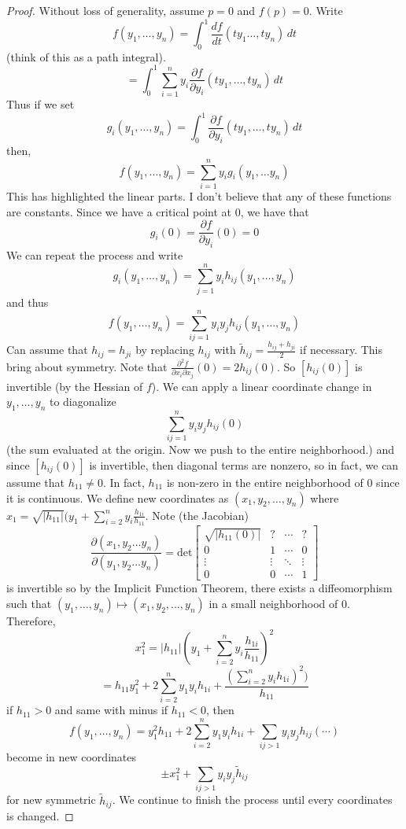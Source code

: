 \documentclass[12pt]{article}
\begin{document}
\begin{proof}
Without loss of generality, assume $p=0$ and $f(p)=0$. Write 
$$f(y_1, \dots, y_n) = \int^1_0 \frac{df}{dt}(ty_1 \dots, ty_n) \,dt$$
(think of this as a path integral).
$$=\int_0^1 \sum_{i=1}^n y_i\frac{\partial f}{\partial y_i }(ty_1, \dots, ty_n) \,dt $$
Thus if we set
$$g_i (y_1, \dots, y_n) = \int^1_0 \frac{\partial f}{\partial y_i }(ty_1, \dots, ty_n) \,dt$$
then,
$$f(y_1, \dots, y_n) = \sum^n_{i=1} y_ig_i(y_1, \dots y_n)$$
This has highlighted the linear parts. I don't believe that any of these functions are constants. Since we have a critical point at $0$, we have that 
$$g_i(0) = \frac{\partial f}{\partial y_i}(0) = 0$$
We can repeat the process and write 
$$g_i(y_1, \dots, y_n) = \sum^n_{j=1} y_i h_{ij}(y_1, \dots, y_n)$$
and thus 
$$f(y_1, \dots, y_n) = \sum^{n}_{ij=1} y_i y_j h_{ij}(y_1, \dots, y_n)$$
Can assume that $h_{ij} = h_{ji}$ by replacing $h_{ij}$ with $\tilde{h}_{ij} = \frac{h_{ij} + h_{ji}}{2}$ if necessary. This bring about symmetry. Note that $\frac{\partial^2 f}{\partial x_i \partial x_j}(0) = 2h_{ij}(0)$. So $[h_{ij}(0)]$ is invertible (by the Hessian of $f$). We can apply a linear coordinate change in $y_1, \dots, y_n$ to diagonalize 
$$\sum^n_{ij=1} y_iy_j h_{ij}(0)$$
(the sum evaluated at the origin. Now we push to the entire neighborhood.) and since $[h_{ij}(0)]$ is invertible, then diagonal terms are nonzero, so in fact, we can assume that $h_{11} \not = 0$. In fact, $h_11$ is non-zero in the entire neighborhood of $0$ since it is continuous. We define new coordinates as $(x_1, y_2, \dots, y_n)$ where $x_1 = \sqrt{\vert h_{11} \vert } (y_1 + \sum^n_{i=2} y_i \frac{h_{1i}}{h_{11}}$. Note (the Jacobian)
$$ \frac{\partial(x_1, y_2 \dots y_n)}{\partial(y_1, y_2 \dots y_n)} = \text{det}\begin{bmatrix} \sqrt{\vert h_{11}(0)\vert} & ? & \cdots & ? \\
0 & 1 & \cdots & 0 \\
\vdots & \vdots & \ddots & \vdots \\ 0 & 0 &  \cdots& 1 \end{bmatrix}$$
is invertible so by the Implicit Function Theorem, there exists a diffeomorphism such that $(y_1, \dots, y_n) \mapsto (x_1, y_2, \dots, y_n)$ in a small neighborhood of $0$. 
Therefore,
$$x_1^2 = \vert h_{11} \vert (y_1 + \sum^n_{i=2} y_i \frac{h_{1i}}{h_11})^2 $$
$$ = h_{11} y_1^2 + 2 \sum^n_{i=2} y_1y_ih_{1i} + \frac{(\sum^n_{i=2} y_i h_{1i})^2)}{h_11}$$
if $h_{11} > 0$ and same with minus if $h_{11} < 0$, then 
$$f(y_1, \dots, y_n) = y_1^2 h_{11} + 2 \sum^n_{i=2} y_1 y_i h_{1i} + \sum_{ij > 1}y_iy_j h_{ij} ( \cdots )$$
become in new coordinates
$$\pm x_1^2 + \sum_{ij>1} y_i y_j \tilde{h}_{ij}$$
for new symmetric $\tilde{h}_{ij}$. We continue to finish the process until every coordinates is changed.
\end{proof}
\end{document}
